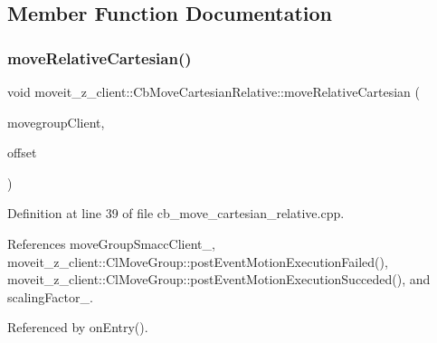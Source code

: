 \subsection{Member Function Documentation}
\mbox{\label{classmoveit__z__client_1_1CbMoveCartesianRelative_aa8535a52826c36b103abebba6da7737f}} 
\subsubsection{\texorpdfstring{move\+Relative\+Cartesian()}{moveRelativeCartesian()}}
{\footnotesize\ttfamily void moveit\+\_\+z\+\_\+client\+::\+Cb\+Move\+Cartesian\+Relative\+::move\+Relative\+Cartesian (\begin{DoxyParamCaption}\item[{moveit\+::planning\+\_\+interface\+::\+Move\+Group\+Interface $\ast$}]{movegroup\+Client,  }\item[{geometry\+\_\+msgs\+::\+Vector3 \&}]{offset }\end{DoxyParamCaption})}



Definition at line 39 of file cb\+\_\+move\+\_\+cartesian\+\_\+relative.\+cpp.



References move\+Group\+Smacc\+Client\+\_\+, moveit\+\_\+z\+\_\+client\+::\+Cl\+Move\+Group\+::post\+Event\+Motion\+Execution\+Failed(), moveit\+\_\+z\+\_\+client\+::\+Cl\+Move\+Group\+::post\+Event\+Motion\+Execution\+Succeded(), and scaling\+Factor\+\_\+.



Referenced by on\+Entry().


